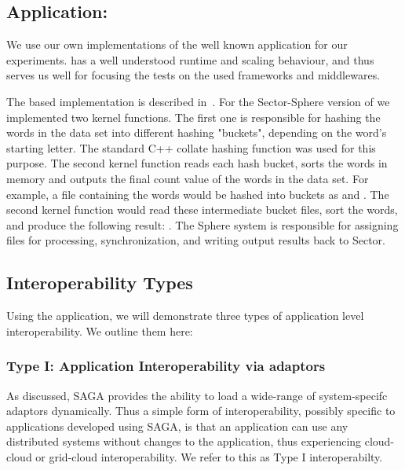 \documentclass[3p,twocolumn]{elsarticle}
\begin{document}
\subsection{Application: \Wc}
\label{ssec:app}

We use our own implementations of the well known \wc application for
our experiments.  \Wc has a well understood runtime and scaling
behaviour, and thus serves us well for focusing the tests on the used
frameworks and middlewares.

The \mr based \wc implementation is described in~\cite{saga_ccgrid09}.
For the Sector-Sphere version of \wc we implemented two kernel
functions. The first one is responsible for hashing the
words in the data set into different hashing "buckets", depending on
the word's starting letter.  The standard C++ collate hashing function
was used for this purpose.  The second kernel function reads each hash
bucket, sorts the words in memory and outputs the final count value of
the words in the data set.  For example, a file containing the words
 would be hashed into buckets as
 and .  The second kernel
function would read these intermediate bucket files, sort the words,
and produce the following result:  .  The Sphere system is responsible for assigning files for
processing, synchronization, and writing output results back to
Sector.

\subsection{Interoperability Types}

Using the \wc application, we will demonstrate three types of
application level interoperability. We outline them here:


\subsubsection{Type I: Application Interoperability via adaptors}
%
%

As discussed, SAGA provides the ability to load a wide-range of
system-specifc adaptors dynamically. Thus a simple form of
interoperability, possibly specific to applications developed using
SAGA, is that an application can use any distributed systems without
changes to the application, thus experiencing cloud-cloud or
grid-cloud interoperability.  We refer to this as Type I
interoperabilty.
\end{document}
